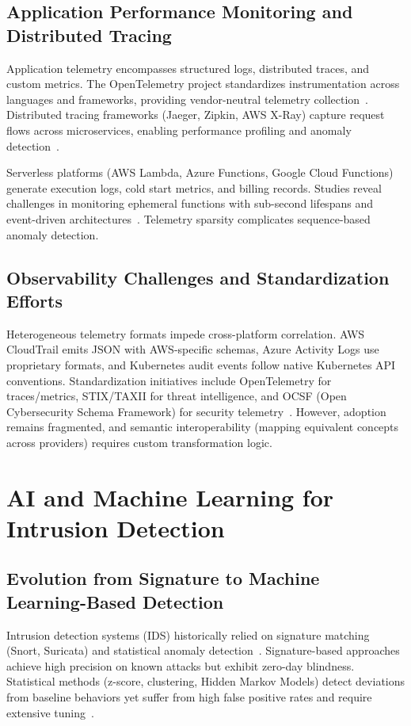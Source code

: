 \subsection{Application Performance Monitoring and Distributed Tracing}
Application telemetry encompasses structured logs, distributed traces, and custom metrics. The OpenTelemetry project standardizes instrumentation across languages and frameworks, providing vendor-neutral telemetry collection~\cite{opentelemetry2023}. Distributed tracing frameworks (Jaeger, Zipkin, AWS X-Ray) capture request flows across microservices, enabling performance profiling and anomaly detection~\cite{sambasivan2016tracing}.

Serverless platforms (AWS Lambda, Azure Functions, Google Cloud Functions) generate execution logs, cold start metrics, and billing records. Studies reveal challenges in monitoring ephemeral functions with sub-second lifespans and event-driven architectures~\cite{schwartz2021serverless}. Telemetry sparsity complicates sequence-based anomaly detection.

\subsection{Observability Challenges and Standardization Efforts}
Heterogeneous telemetry formats impede cross-platform correlation. AWS CloudTrail emits JSON with AWS-specific schemas, Azure Activity Logs use proprietary formats, and Kubernetes audit events follow native Kubernetes API conventions. Standardization initiatives include OpenTelemetry for traces/metrics, STIX/TAXII for threat intelligence, and OCSF (Open Cybersecurity Schema Framework) for security telemetry~\cite{ocsf2023}. However, adoption remains fragmented, and semantic interoperability (mapping equivalent concepts across providers) requires custom transformation logic.

\section{AI and Machine Learning for Intrusion Detection}\label{sec:lit-aiml}
\subsection{Evolution from Signature to Machine Learning-Based Detection}
Intrusion detection systems (IDS) historically relied on signature matching (Snort, Suricata) and statistical anomaly detection~\cite{chandola2009anomaly}. Signature-based approaches achieve high precision on known attacks but exhibit zero-day blindness. Statistical methods (z-score, clustering, Hidden Markov Models) detect deviations from baseline behaviors yet suffer from high false positive rates and require extensive tuning~\cite{garcia2009anomaly}.

